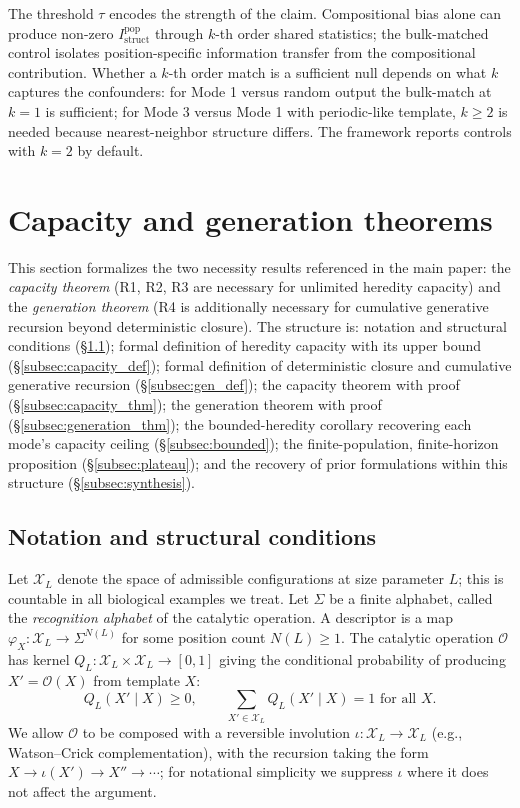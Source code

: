\documentclass[11pt]{article}
\theoremstyle{plain}
\theoremstyle{definition}
\newcommand{\Istructpop}{I_{\mathrm{struct}}^{\mathrm{pop}}}
\newcommand{\descX}{\varphi_X}
\newcommand{\Xset}{\mathcal{X}}
\newcommand{\Op}{\mathcal{O}}
\begin{document}
The threshold $\tau$ encodes the strength of the claim. Compositional bias alone can produce non-zero $\Istructpop$ through $k$-th order shared statistics; the bulk-matched control isolates position-specific information transfer from the compositional contribution. Whether a $k$-th order match is a sufficient null depends on what $k$ captures the confounders: for Mode 1 versus random output the bulk-match at $k = 1$ is sufficient; for Mode 3 versus Mode 1 with periodic-like template, $k \ge 2$ is needed because nearest-neighbor structure differs. The framework reports controls with $k = 2$ by default.


\section{Capacity and generation theorems}
\label{sec:capacity_generation_theorems}

This section formalizes the two necessity results referenced in the main paper: the \emph{capacity theorem} (R1, R2, R3 are necessary for unlimited heredity capacity) and the \emph{generation theorem} (R4 is additionally necessary for cumulative generative recursion beyond deterministic closure). The structure is: notation and structural conditions (\S\ref{subsec:conditions}); formal definition of heredity capacity with its upper bound (\S\ref{subsec:capacity_def}); formal definition of deterministic closure and cumulative generative recursion (\S\ref{subsec:gen_def}); the capacity theorem with proof (\S\ref{subsec:capacity_thm}); the generation theorem with proof (\S\ref{subsec:generation_thm}); the bounded-heredity corollary recovering each mode's capacity ceiling (\S\ref{subsec:bounded}); the finite-population, finite-horizon proposition (\S\ref{subsec:plateau}); and the recovery of prior formulations within this structure (\S\ref{subsec:synthesis}).

\subsection{Notation and structural conditions}
\label{subsec:conditions}

Let $\Xset_L$ denote the space of admissible configurations at size parameter $L$; this is countable in all biological examples we treat. Let $\Sigma$ be a finite alphabet, called the \emph{recognition alphabet} of the catalytic operation. A descriptor is a map $\descX : \Xset_L \to \Sigma^{N(L)}$ for some position count $N(L) \ge 1$. The catalytic operation $\Op$ has kernel $Q_L : \Xset_L \times \Xset_L \to [0,1]$ giving the conditional probability of producing $X' = \Op(X)$ from template $X$:
\begin{equation}
Q_L(X' \mid X) \ge 0, \qquad \sum_{X' \in \Xset_L} Q_L(X' \mid X) = 1 \text{ for all } X.
\end{equation}
We allow $\Op$ to be composed with a reversible involution $\iota : \Xset_L \to \Xset_L$ (e.g., Watson--Crick complementation), with the recursion taking the form $X \to \iota(X') \to X'' \to \cdots$; for notational simplicity we suppress $\iota$ where it does not affect the argument.
\end{document}
